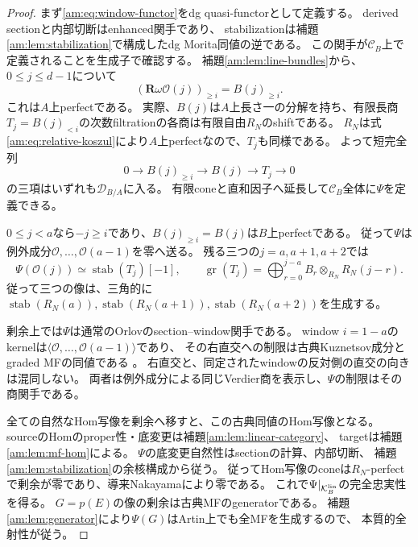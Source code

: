 \begin{proof}
まず\eqref{am:eq:window-functor}をdg quasi-functorとして定義する。
derived sectionと内部切断はenhanced関手であり、
stabilizationは補題\ref{am:lem:stabilization}で構成したdg Morita同値の逆である。
この関手が$\mathcal C_B$上で定義されることを生成子で確認する。
補題\ref{am:lem:line-bundles}から、$0\le j\le d-1$について
\[
 (\mathbf R\omega\mathcal O(j))_{\ge i}=B(j)_{\ge i}.
\]
これは$A$上perfectである。
実際、$B(j)$は$A$上長さ一の分解を持ち、有限長商
$T_j=B(j)_{<i}$の次数filtrationの各商は有限自由$R_N$のshiftである。
$R_N$は式\eqref{am:eq:relative-koszul}により$A$上perfectなので、$T_j$も同様である。
よって短完全列
\[
 0\to B(j)_{\ge i}\to B(j)\to T_j\to0
\]
の三項はいずれも$\mathcal D_{B/A}$に入る。
有限coneと直和因子へ延長して$\mathcal C_B$全体に$\Psi$を定義できる。

$0\le j<a$なら$-j\ge i$であり、$B(j)_{\ge i}=B(j)$は$B$上perfectである。
従って$\Psi$は例外成分$\mathcal O,\ldots,\mathcal O(a-1)$を零へ送る。
残る三つの$j=a,a+1,a+2$では
\begin{equation}\label{am:eq:three-images}
 \Psi(\mathcal O(j))\simeq\operatorname{stab}(T_j)[-1],\qquad
 \operatorname{gr}(T_j)=
 \bigoplus_{r=0}^{j-a}B_r\otimes_{R_N}R_N(j-r).
\end{equation}
従って三つの像は、三角的に
$\operatorname{stab}(R_N(a)),\operatorname{stab}(R_N(a+1)),
\operatorname{stab}(R_N(a+2))$を生成する。

剰余上では$\Psi$は通常のOrlovのsection--window関手である。
window $i=1-a$のkernelは$\langle\mathcal O,\ldots,\mathcal O(a-1)\rangle$であり、
その右直交への制限は古典Kuznetsov成分とgraded MFの同値である
\cite[Theorem 6.4 and its proof]{LP-BS}。
右直交と、同定されたwindowの反対側の直交の向きは混同しない。
両者は例外成分による同じVerdier商を表示し、$\Psi$の制限はその商関手である。

全ての自然なHom写像を剰余へ移すと、この古典同値のHom写像となる。
sourceのHomのproper性・底変更は補題\ref{am:lem:linear-category}、
targetは補題\ref{am:lem:mf-hom}による。
$\Psi$の底変更自然性はsectionの計算、内部切断、
補題\ref{am:lem:stabilization}の余核構成から従う。
従ってHom写像のconeは$R_N$-perfectで剰余が零であり、導来Nakayamaにより零である。
これで$\Psi|_{\mathcal K_B^{\rm lin}}$の完全忠実性を得る。
$G=p(E)$の像の剰余は古典MFのgeneratorである。
補題\ref{am:lem:generator}により$\Psi(G)$はArtin上でも全MFを生成するので、
本質的全射性が従う。


\end{proof}
